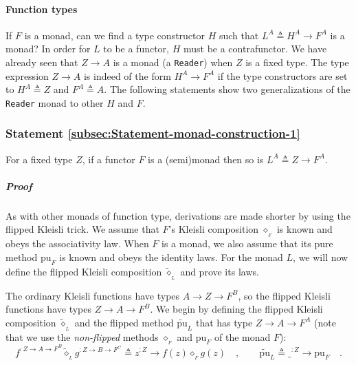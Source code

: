 \paragraph{Function types}

If $F$ is a monad, can we find a type constructor $H$ such that
$L^{A}\triangleq H^{A}\rightarrow F^{A}$ is a monad? In order for
$L$ to be a functor, $H$ must be a contrafunctor. We have already
seen that $Z\rightarrow A$ is a monad (a \lstinline!Reader!) when
$Z$ is a fixed type. The type expression $Z\rightarrow A$ is indeed
of the form $H^{A}\rightarrow F^{A}$ if the type constructors are
set to $H^{A}\triangleq Z$ and $F^{A}\triangleq A$. The following
statements show two generalizations of the \lstinline!Reader! monad
to other $H$ and $F$.

\subsubsection{Statement \label{subsec:Statement-monad-construction-1}\ref{subsec:Statement-monad-construction-1}}

For a fixed type $Z$, if a functor $F$ is a (semi)monad then so
is $L^{A}\triangleq Z\rightarrow F^{A}$.

\subparagraph{Proof}

As with other monads of function type, derivations are made shorter
by using the flipped Kleisli trick. We assume that $F$\textsf{'}s Kleisli
composition $\diamond_{_{F}}$ is known and obeys the associativity
law. When $F$ is a monad, we also assume that its pure method $\text{pu}_{F}$
is known and obeys the identity laws. For the monad $L$, we will
now define the flipped
Kleisli composition $\tilde{\diamond}_{_{L}}$ and prove its laws.

The ordinary Kleisli functions have types $A\rightarrow Z\rightarrow F^{B}$,
so the flipped Kleisli functions have types $Z\rightarrow A\rightarrow F^{B}$.
We begin by defining the flipped Kleisli composition $\tilde{\diamond}_{_{L}}$
and the flipped method $\tilde{\text{pu}}_{L}$ that has type $Z\rightarrow A\rightarrow F^{A}$
(note that we use the \emph{non-flipped} methods $\diamond_{_{F}}$
and $\text{pu}_{F}$ of the monad $F$):
\[
f^{:Z\rightarrow A\rightarrow F^{B}}\tilde{\diamond}_{_{L}}g^{:Z\rightarrow B\rightarrow F^{C}}\triangleq z^{:Z}\rightarrow f(z)\diamond_{_{F}}g(z)\quad,\quad\quad\tilde{\text{pu}}_{L}\triangleq\_^{:Z}\rightarrow\text{pu}_{F}\quad.
\]

